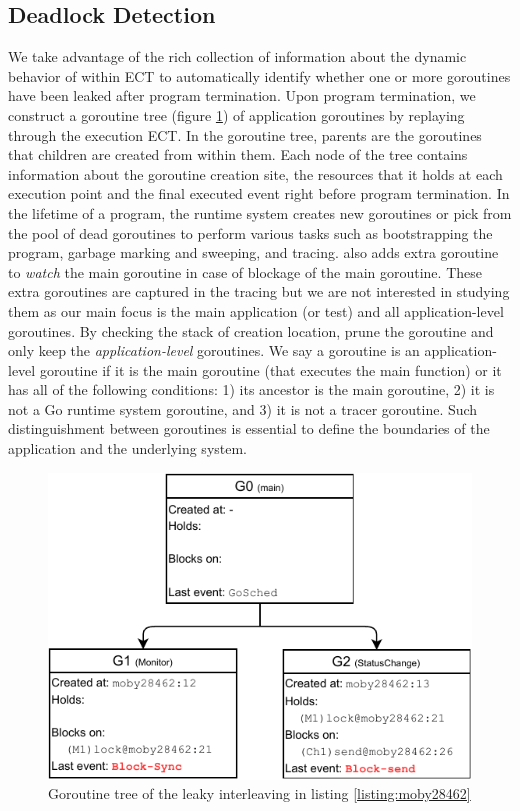 \subsection{Deadlock Detection}
\label{sec:dld}
We take advantage of the rich collection of information about the dynamic behavior of within ECT to automatically identify whether one or more goroutines have been leaked after program termination.
%
Upon program termination, we construct a goroutine tree (figure \ref{fig:gtree}) of application goroutines by replaying through the execution ECT.
%
In the goroutine tree, parents are the goroutines that children are created from within them. Each node of the tree contains information about the goroutine creation site, the resources that it holds at each execution point and the final executed event right before program termination.
%
In the lifetime of a program, the runtime system creates new goroutines or pick from the pool of dead goroutines to perform various tasks such as bootstrapping the program, garbage marking and sweeping, and tracing.
%
\goat also adds extra goroutine to \textit{watch} the main goroutine in case of blockage of the main goroutine.
%
These extra goroutines are captured in the tracing but we are not interested in studying them as our main focus is the main application (or test) and all application-level goroutines.
%
By checking the stack of creation location, \goat prune the goroutine and only keep the \textit{application-level} goroutines.
%
We say a goroutine is an application-level goroutine if it is the main goroutine (that executes the main function) or it has all of the following conditions:
1) its ancestor is the main goroutine,
2) it is not a Go runtime system goroutine, and
3) it is not a tracer goroutine.
Such distinguishment between goroutines is essential to define the boundaries of the application and the underlying system.

\begin{figure}[]
\centering
\includegraphics[width=0.75\linewidth]{figs/gtree.pdf}
\caption{Goroutine tree of the leaky interleaving in listing \ref{listing:moby28462}}
\label{fig:gtree}
\end{figure}

